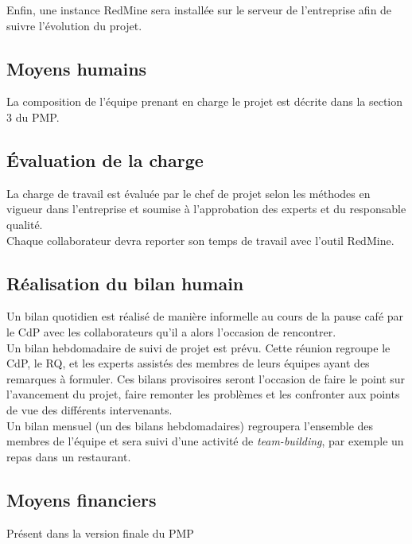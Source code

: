 \vskip 6pt

Enfin, une instance RedMine sera installée sur le serveur de l'entreprise
afin de suivre l'évolution du projet.


\subsection{Moyens humains}

La composition de l'équipe prenant en charge le projet est décrite dans la
section 3 du PMP.

\subsection{Évaluation de la charge}

La charge de travail est évaluée par le chef de projet selon les méthodes
en vigueur dans l'entreprise  et soumise à l'approbation des experts et du
responsable qualité.\\

Chaque collaborateur devra reporter son temps de travail avec l'outil
RedMine.

\subsection{Réalisation du bilan humain}

Un bilan quotidien est réalisé de manière informelle au cours de la pause
café par le CdP avec les collaborateurs qu'il a alors l'occasion de
rencontrer.\\

Un bilan hebdomadaire de suivi de projet est prévu. Cette réunion regroupe
le CdP, le RQ, et les experts assistés des membres de leurs équipes ayant
des remarques à formuler. Ces bilans provisoires seront l'occasion de faire
le point sur l'avancement du projet, faire remonter les problèmes et les
confronter aux points de vue des différents intervenants.\\

Un bilan mensuel (un des bilans hebdomadaires) regroupera l'ensemble des
membres de l'équipe et sera suivi d'une activité de \textit{team-building},
par exemple un repas dans un restaurant.

\subsection{Moyens financiers}

Présent dans la version finale du PMP
